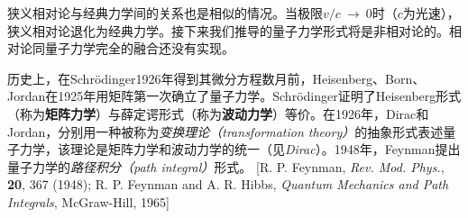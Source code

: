 \documentclass[12pt,a4paper,openany]{ctexbook}
\begin{document}
\begin{flushleft}
狭义相对论与经典力学间的关系也是相似的情况。当极限$v/c\ \to\ 0$时（$c$为光速），狭义相对论退化为经典力学。接下来我们推导的量子力学形式将是非相对论的。相对论同量子力学完全的融合还没有实现。

历史上，在Schr\"odinger1926年得到其微分方程数月前，Heisenberg、Born、Jordan在1925年用矩阵第一次确立了量子力学。Schr\"odinger证明了Heisenberg形式（称为\textbf{矩阵力学}）与薛定谔形式（称为\textbf{波动力学}）等价。在1926年，Dirac和Jordan，分别用一种被称为\textit{变换理论（transformation theory）}的抽象形式表述量子力学，该理论是矩阵力学和波动力学的统一（见\textit{Dirac}）。1948年，Feynman提出量子力学的\textit{路径积分（path integral）}形式。 [R. P. Feynman, \textit{Rev. Mod. Phys.}, \textbf{20}, 367 (1948); R. P. Feynman and A. R. Hibbs, \textit{Quantum Mechanics and Path Integrals}, McGraw-Hill, 1965]
\end{flushleft}
\end{document}
